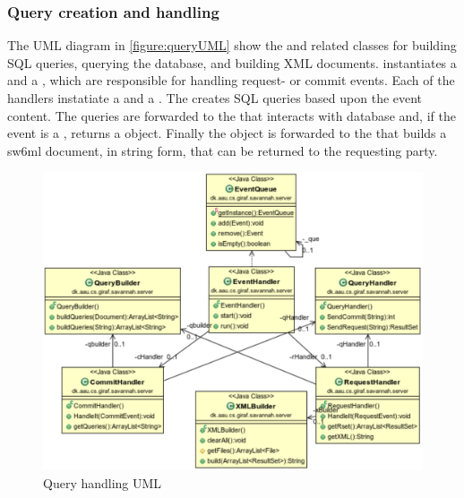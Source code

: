 \subsubsection{Query creation and handling}

The UML diagram in \autoref{figure:queryUML} show the  and related classes for building SQL queries, querying the database, and building XML documents.
 instantiates a  and a , which are responsible for handling request- or commit events.
Each of the handlers instatiate a  and a . The  creates SQL queries based upon the event content. The queries are forwarded to the 
that interacts with database and, if the event is a , returns a  object. Finally the  object is forwarded to the  that builds a sw6ml document,
in string form, that can be returned to the requesting party. 
\begin{figure}[H]
 \centering
  \includegraphics[scale=0.65]{images/queryhandling}
  \caption{Query handling UML}
  \label{figure:queryUML}
\end{figure}

